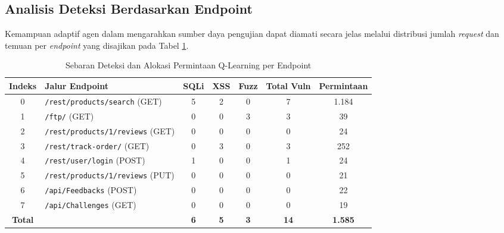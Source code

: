 \subsection{Analisis Deteksi Berdasarkan Endpoint}

Kemampuan adaptif agen dalam mengarahkan sumber daya pengujian dapat diamati secara jelas melalui distribusi jumlah \textit{request} dan temuan per \textit{endpoint} yang disajikan pada Tabel \ref{tab:ql_per_endpoint}.

\begin{table}[H]
\centering
\caption{Sebaran Deteksi dan Alokasi Permintaan Q-Learning per Endpoint}
\label{tab:ql_per_endpoint}
\begin{tabular}{|c|l|c|c|c|c|c|}
\hline
\textbf{Indeks} & \textbf{Jalur Endpoint} & \textbf{SQLi} & \textbf{XSS} & \textbf{Fuzz} & \textbf{Total Vuln} & \textbf{Permintaan} \\
\hline
0 & \texttt{/rest/products/search} (GET) & 5 & 2 & 0 & 7 & 1.184 \\ 
1 & \texttt{/ftp/} (GET) & 0 & 0 & 3 & 3 & 39 \\
2 & \texttt{/rest/products/1/reviews} (GET) & 0 & 0 & 0 & 0 & 24 \\ 
3 & \texttt{/rest/track-order/} (GET) & 0 & 3 & 0 & 3 & 252 \\ 
4 & \texttt{/rest/user/login} (POST) & 1 & 0 & 0 & 1 & 24 \\
5 & \texttt{/rest/products/1/reviews} (PUT) & 0 & 0 & 0 & 0 & 21 \\
6 & \texttt{/api/Feedbacks} (POST) & 0 & 0 & 0 & 0 & 22 \\
7 & \texttt{/api/Challenges} (GET) & 0 & 0 & 0 & 0 & 19 \\
\hline
\textbf{Total} & & \textbf{6} & \textbf{5} & \textbf{3} & \textbf{14} & \textbf{1.585} \\
\hline
\end{tabular}
\end{table}

